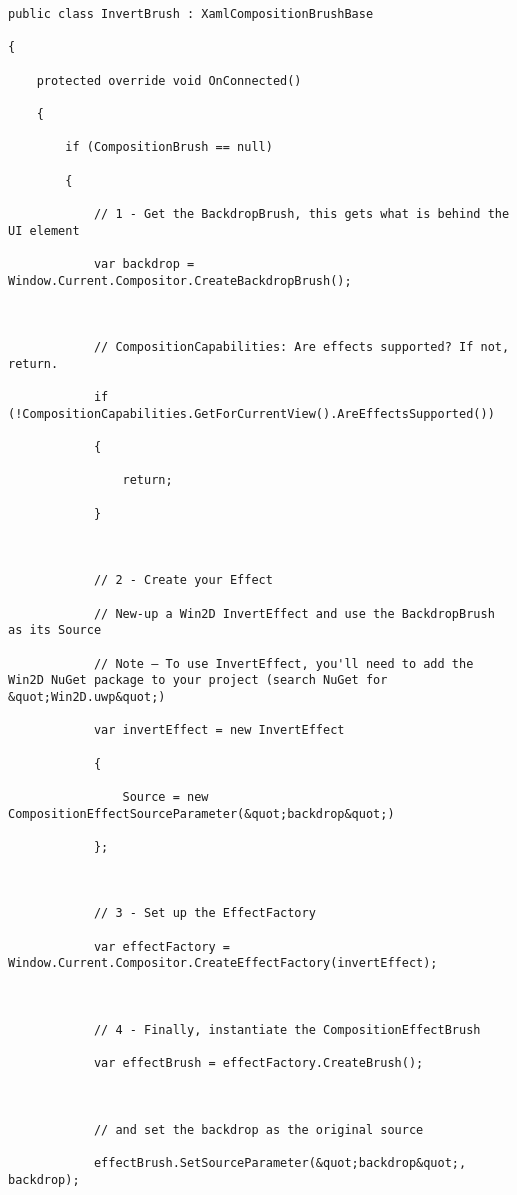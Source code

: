 \begin{lstlisting}[style=CSharpStyle]
public class InvertBrush : XamlCompositionBrushBase

{
	
	protected override void OnConnected()
	
	{
		
		if (CompositionBrush == null)
		
		{
			
			// 1 - Get the BackdropBrush, this gets what is behind the UI element
			
			var backdrop = Window.Current.Compositor.CreateBackdropBrush();
			
			
			
			// CompositionCapabilities: Are effects supported? If not, return.
			
			if (!CompositionCapabilities.GetForCurrentView().AreEffectsSupported())
			
			{ 
				
				return;
				
			}
			
			
			
			// 2 - Create your Effect
			
			// New-up a Win2D InvertEffect and use the BackdropBrush as its Source
			
			// Note – To use InvertEffect, you'll need to add the Win2D NuGet package to your project (search NuGet for &quot;Win2D.uwp&quot;)
			
			var invertEffect = new InvertEffect
			
			{
				
				Source = new CompositionEffectSourceParameter(&quot;backdrop&quot;)
				
			};
			
			
			
			// 3 - Set up the EffectFactory
			
			var effectFactory = Window.Current.Compositor.CreateEffectFactory(invertEffect);
			
			
			
			// 4 - Finally, instantiate the CompositionEffectBrush
			
			var effectBrush = effectFactory.CreateBrush();
			
			
			
			// and set the backdrop as the original source 
			
			effectBrush.SetSourceParameter(&quot;backdrop&quot;, backdrop);
			

\end{lstlisting}
